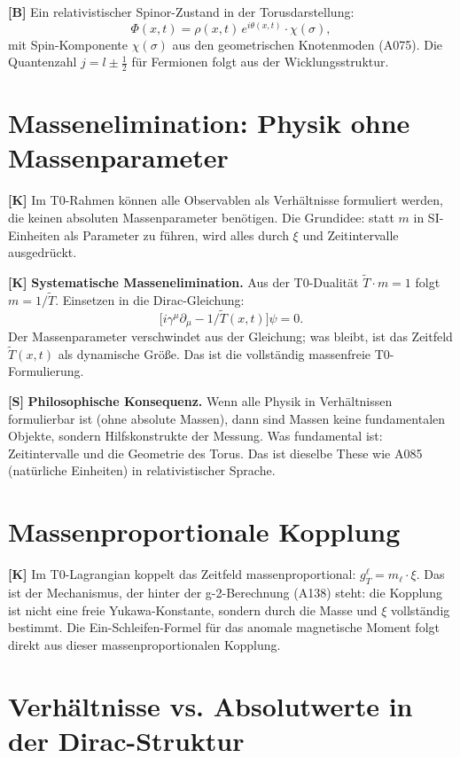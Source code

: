 \textbf{[B]} Ein relativistischer Spinor-Zustand in der Torusdarstellung:
\[
  \Phi(x,t) = \rho(x,t)\,e^{i\theta(x,t)}\cdot\chi(\sigma),
\]
mit Spin-Komponente $\chi(\sigma)$ aus den geometrischen Knotenmoden (A075).
Die Quantenzahl $j=l\pm\tfrac12$ für Fermionen folgt aus der Wicklungsstruktur.

\section{Massenelimination: Physik ohne Massenparameter}

\textbf{[K]} Im T0-Rahmen können alle Observablen als Verhältnisse formuliert werden,
die keinen absoluten Massenparameter benötigen. Die Grundidee: statt $m$ in SI-Einheiten
als Parameter zu führen, wird alles durch $\xi$ und Zeitintervalle ausgedrückt.

\textbf{[K]} \textbf{Systematische Massenelimination.} Aus der T0-Dualität $\tilde T\cdot m=1$
folgt $m=1/\tilde T$. Einsetzen in die Dirac-Gleichung:
\[
  \bigl[i\gamma^\mu\partial_\mu - 1/\tilde T(x,t)\bigr]\psi = 0.
\]
Der Massenparameter verschwindet aus der Gleichung; was bleibt, ist das Zeitfeld
$\tilde T(x,t)$ als dynamische Größe. Das ist die vollständig massenfreie T0-Formulierung.

\textbf{[S]} \textbf{Philosophische Konsequenz.} Wenn alle Physik in Verhältnissen
formulierbar ist (ohne absolute Massen), dann sind Massen keine fundamentalen
Objekte, sondern Hilfskonstrukte der Messung. Was fundamental ist: Zeitintervalle
und die Geometrie des Torus. Das ist dieselbe These wie A085 (natürliche Einheiten)
in relativistischer Sprache.

\section{Massenproportionale Kopplung}

\textbf{[K]} Im T0-Lagrangian koppelt das Zeitfeld massenproportional:
$g_T^\ell = m_\ell\cdot\xi$. Das ist der Mechanismus, der hinter der g-2-Berechnung
(A138) steht: die Kopplung ist nicht eine freie Yukawa-Konstante, sondern durch die
Masse und $\xi$ vollständig bestimmt. Die Ein-Schleifen-Formel für das anomale
magnetische Moment folgt direkt aus dieser massenproportionalen Kopplung.

\section{Verhältnisse vs. Absolutwerte in der Dirac-Struktur}

